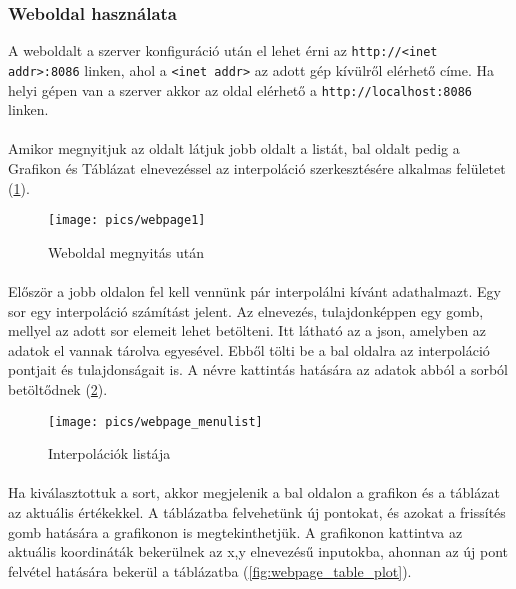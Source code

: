 \subsubsection{Weboldal használata}
	A weboldalt a szerver konfiguráció után el lehet érni az \texttt{http://<inet addr>:8086} linken, ahol a \texttt{<inet addr>} az adott gép kívülről elérhető címe. Ha helyi gépen van a szerver akkor az oldal elérhető a \texttt{http://localhost:8086} linken.

	\paragraph{}
	Amikor megnyitjuk az oldalt látjuk jobb oldalt a listát, bal oldalt pedig a Grafikon és Táblázat elnevezéssel az interpoláció szerkesztésére alkalmas felületet (\ref{fig:webpage1}).

	\begin{figure}[h]
		\texttt{[image: pics/webpage1]}
		\centering
		\caption{Weboldal megnyitás után\label{fig:webpage1}}
	\end{figure}

	\paragraph{}
	Először a jobb oldalon fel kell vennünk pár interpolálni kívánt adathalmazt. Egy sor egy interpoláció számítást jelent. Az elnevezés, tulajdonképpen egy gomb, mellyel az adott sor elemeit lehet betölteni.\newline
	Itt látható az a json, amelyben az adatok el vannak tárolva egyesével. Ebből tölti be a bal oldalra az interpoláció pontjait és tulajdonságait is. A névre kattintás hatására az adatok abból a sorból betöltődnek (\ref{fig:webpage_menulist}).

	\begin{figure}[h]
		\texttt{[image: pics/webpage\_menulist]}
		\centering
		\caption{Interpolációk listája\label{fig:webpage_menulist}}
	\end{figure}
	
	\paragraph{}
	Ha kiválasztottuk a sort, akkor megjelenik a bal oldalon a grafikon és a táblázat az aktuális értékekkel. A táblázatba felvehetünk új pontokat, és azokat a frissítés gomb hatására a grafikonon is megtekinthetjük. A grafikonon kattintva az aktuális koordináták bekerülnek az x,y elnevezésű inputokba, ahonnan az új pont felvétel hatására bekerül a táblázatba (\ref{fig:webpage_table_plot}).

